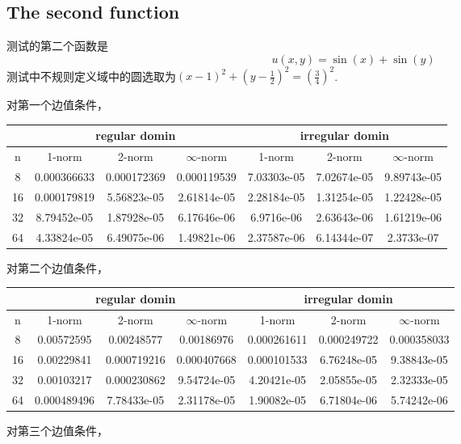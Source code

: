 \documentclass[a4paper,11.5pt,UTF8]{ctexart}
\begin{document}
\begin{large}
\subsection{The second function}
\par 测试的第二个函数是
$$ u(x,y)=\sin(x)+\sin(y) $$
测试中不规则定义域中的圆选取为$(x-1)^2+(y-\frac{1}{2})^2=(\frac{3}{4})^2$.
\par 对第一个边值条件，
\begin{center}
\begin{tabular}{|c|c|c|c|c|c|c|}
	\hline
	& \multicolumn{3}{c|}{regular domin} & \multicolumn{3}{c|}{irregular domin} \\
	\hline
	n & 1-norm & 2-norm & $\infty$-norm & 1-norm &	2-norm& $\infty$-norm \\
	\hline
	8& 0.000366633 & 0.000172369 & 0.000119539 & 7.03303e-05 & 7.02674e-05 & 9.89743e-05 \\
	\hline
	16& 0.000179819 & 5.56823e-05 & 2.61814e-05 & 2.28184e-05 &1.31254e-05	&1.22428e-05\\
	\hline
	32& 8.79452e-05 & 1.87928e-05 & 6.17646e-06 & 6.9716e-06 &2.63643e-06&1.61219e-06\\
	\hline
	64& 4.33824e-05 & 6.49075e-06 & 1.49821e-06 & 2.37587e-06 &6.14344e-07&2.3733e-07 \\
	\hline
\end{tabular}
\end{center}
\par 对第二个边值条件，
\begin{center}
\begin{tabular}{|c|c|c|c|c|c|c|}
	\hline
	& \multicolumn{3}{c|}{regular domin} & \multicolumn{3}{c|}{irregular domin} \\
	\hline
	n & 1-norm & 2-norm & $\infty$-norm & 1-norm &	2-norm& $\infty$-norm \\
	\hline
	8& 0.00572595 & 0.00248577 & 0.00186976 & 0.000261611 & 0.000249722 & 0.000358033 \\
	\hline
	16& 0.00229841 & 0.000719216 & 0.000407668 & 0.000101533 &6.76248e-05	&9.38843e-05\\
	\hline
	32& 0.00103217 & 0.000230862 & 9.54724e-05 & 4.20421e-05 &2.05855e-05&2.32333e-05\\
	\hline
	64& 0.000489496 & 7.78433e-05 & 2.31178e-05 & 1.90082e-05 &6.71804e-06&5.74242e-06 \\
	\hline
\end{tabular}
\end{center}
\par 对第三个边值条件，

\end{large}
\end{document}
